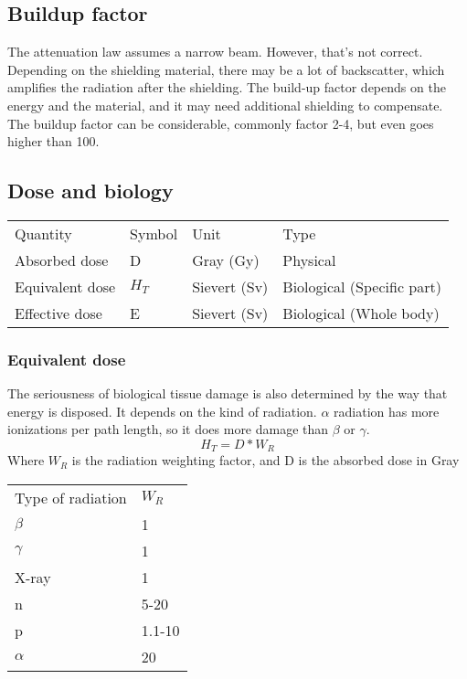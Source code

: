 \subsection{Buildup factor}
The attenuation law assumes a narrow beam. However, that's not correct. Depending on the shielding material, there may be a lot of backscatter, which amplifies the radiation after the shielding. The build-up factor depends on the energy and the material, and it may need additional shielding to compensate. The buildup factor can be considerable, commonly factor 2-4, but even goes higher than 100.

\subsection{Dose and biology}
\begin{table}[]
\begin{tabular}{llll}
Quantity        & Symbol & Unit         & Type       \\
Absorbed dose   & D      & Gray (Gy)    & Physical   \\
Equivalent dose & $H_T$    & Sievert (Sv) & Biological (Specific part) \\
Effective dose  & E      & Sievert (Sv) & Biological (Whole body)
\end{tabular}
\end{table}

\subsubsection{Equivalent dose}
The seriousness of biological tissue damage is also determined by the way that energy is disposed. It depends on the kind of radiation. $\alpha$ radiation has more ionizations per path length, so it does more damage than $\beta$ or $\gamma$.
\[ H_T = D * W_R\]
Where $W_R$ is the radiation weighting factor, and D is the absorbed dose in Gray

\begin{table}[]
\begin{tabular}{ll}
Type of radiation & $W_R$    \\
$\beta$             & 1      \\
$\gamma$            & 1      \\
X-ray             & 1      \\
n                 & 5-20   \\
p                 & 1.1-10 \\
$\alpha$            & 20    
\end{tabular}
\end{table}

